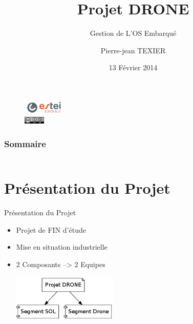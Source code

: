\documentclass[11pt]{beamer}
\title[Equipe segment SOL : Chef de PROJET]{Projet DRONE}
\subtitle{Gestion de L'OS Embarqué}
\institute{ Ecole Supérieure des Technologies Electronique Informatique Infographie  }
\author{Pierre-jean \textsc{TEXIER}}
\date{13 Février 2014}
\begin{document}
	\begin{frame}
	  \maketitle
		\begin{figure}
			\begin{center}
				\includegraphics[width=2cm]{common/estei.png}\\
				\includegraphics[width=1cm]{common/cc.png}
			\end{center}
		\end{figure}
	\end{frame}
		
	\begin{frame}
		\frametitle{Sommaire}
		\begin{columns}[t]
		\begin{column}{5cm}
		\tableofcontents[sections={1-5},hideallsubsections]
		\end{column}
		\begin{column}{5cm}
		\tableofcontents[sections={6-10},hideallsubsections]
		\end{column}
		\end{columns}
	 \end{frame}
	
	
 	\section{Présentation du Projet}
	\begin{frame}{Présentation du Projet}
	
	\begin{itemize}
	 \item Projet de FIN d'étude
	 \pause
	 \item Mise en situation industrielle
	 \pause
	 \item 2 Composants --> 2 Equipes  
	 \pause
	 \begin{center}
		    \includegraphics[width=5cm]{common/projet.png}
	 \end{center}
	\end{itemize}
	\end{frame}
	
\end{document}
